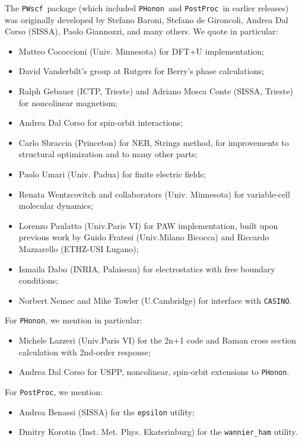 \documentclass[12pt,a4paper]{article}
\def\PWscf{\texttt{PWscf}}
\def\PHonon{\texttt{PHonon}}
\def\PostProc{\texttt{PostProc}}
\begin{document}
The \PWscf\ package (which included \PHonon\ and \PostProc\
in earlier releases)
was originally developed by Stefano Baroni, Stefano
de Gironcoli, Andrea Dal Corso (SISSA), Paolo Giannozzi, and many others.
We quote in particular:
\begin{itemize}
  \item Matteo Cococcioni (Univ. Minnesota) for DFT+U implementation;
  \item David Vanderbilt's group at Rutgers for Berry's phase
  calculations;
  \item Ralph Gebauer (ICTP, Trieste) and Adriano Mosca Conte
  (SISSA, Trieste) for noncolinear magnetism;
  \item Andrea Dal Corso for spin-orbit interactions;
  \item Carlo Sbraccia (Princeton) for NEB, Strings method,
  for improvements to structural optimization
  and to many other parts;
  \item Paolo Umari (Univ. Padua) for finite electric fields;
  \item Renata Wentzcovitch and collaborators (Univ. Minnesota)
  for variable-cell molecular dynamics;
  \item Lorenzo Paulatto (Univ.Paris VI) for PAW implementation, 
  built  upon previous work by Guido Fratesi (Univ.Milano Bicocca)
  and Riccardo Mazzarello (ETHZ-USI Lugano);
 \item Ismaila Dabo (INRIA, Palaiseau) for electrostatics with
 free boundary conditions;
 \item Norbert Nemec and Mike Towler (U.Cambridge) for interface with \texttt{CASINO}.
\end{itemize}
For \PHonon, we mention in particular: 
\begin{itemize}
  \item Michele Lazzeri (Univ.Paris VI) for the 2n+1 code and Raman 
  cross section calculation with 2nd-order response;
 \item Andrea Dal Corso for USPP, noncolinear, spin-orbit
 extensions to \PHonon.
 \end{itemize}
For \PostProc, we mention:
\begin{itemize}
\item Andrea Benassi (SISSA) for the \texttt{epsilon} utility;
\item Dmitry Korotin (Inst. Met. Phys. Ekaterinburg) for the
\texttt{wannier\_ham} utility.
\end{itemize}
\end{document}
